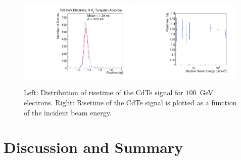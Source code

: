 \documentclass[preprint,1p]{elsarticle}
\begin{document}
\begin{figure}[htbp] 
\centering
\includegraphics[width=0.49\textwidth]{figures/100GeV_risetime.pdf} 
\includegraphics[width=0.49\textwidth]{figures/RisetimeVsEnergy.pdf} 
\caption{ Left: Distribution of risetime of the CdTe signal for $100$~GeV electrons. 
Right: Risetime of the CdTe signal is plotted as a function of the incident beam energy. } 
\label{fig:riseTime} 
\end{figure} 




\section{Discussion and Summary}
\label{sec:summary} 






{}
 




\end{document}
